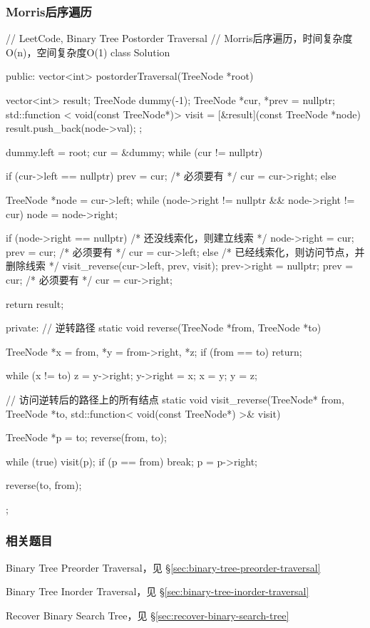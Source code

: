 \subsubsection{Morris后序遍历}
\begin{Code}
// LeetCode, Binary Tree Postorder Traversal
// Morris后序遍历，时间复杂度O(n)，空间复杂度O(1)
class Solution {
public:
    vector<int> postorderTraversal(TreeNode *root) {
        vector<int> result;
        TreeNode dummy(-1);
        TreeNode *cur, *prev = nullptr;
        std::function < void(const TreeNode*)> visit = 
            [&result](const TreeNode *node){
            result.push_back(node->val); 
        };

        dummy.left = root;
        cur = &dummy;
        while (cur != nullptr) {
            if (cur->left == nullptr) {
                prev = cur; /* 必须要有 */
                cur = cur->right;
            } else {
                TreeNode *node = cur->left;
                while (node->right != nullptr && node->right != cur)
                    node = node->right;

                if (node->right == nullptr) { /* 还没线索化，则建立线索 */
                    node->right = cur;
                    prev = cur; /* 必须要有 */
                    cur = cur->left;
                } else { /* 已经线索化，则访问节点，并删除线索  */
                    visit_reverse(cur->left, prev, visit);
                    prev->right = nullptr;
                    prev = cur; /* 必须要有 */
                    cur = cur->right;
                }
            }
        }
        return result;
    }
private:
    // 逆转路径
    static void reverse(TreeNode *from, TreeNode *to) {
        TreeNode *x = from, *y = from->right, *z;
        if (from == to) return;

        while (x != to) {
            z = y->right;
            y->right = x;
            x = y;
            y = z;
        }
    }

    // 访问逆转后的路径上的所有结点
    static void visit_reverse(TreeNode* from, TreeNode *to, 
                     std::function< void(const TreeNode*) >& visit) {
        TreeNode *p = to;
        reverse(from, to);

        while (true) {
            visit(p);
            if (p == from)
                break;
            p = p->right;
        }

        reverse(to, from);
    }
};
\end{Code}


\subsubsection{相关题目}
\begindot
\item Binary Tree Preorder Traversal，见 \S \ref{sec:binary-tree-preorder-traversal}
\item Binary Tree Inorder Traversal，见 \S \ref{sec:binary-tree-inorder-traversal}
\item Recover Binary Search Tree，见 \S \ref{sec:recover-binary-search-tree}
\myenddot


